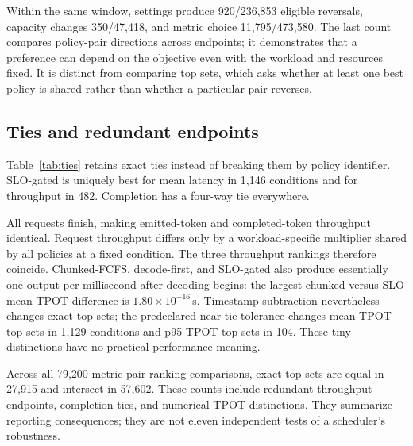 Within the same window, settings produce 920/236,853 eligible reversals,
capacity changes 350/47,418, and metric choice 11,795/473,580. The last count
compares policy-pair directions across endpoints; it demonstrates that a
preference can depend on the objective even with the workload and resources
fixed. It is distinct from comparing top sets, which asks whether at least
one best policy is shared rather than whether a particular pair reverses.

\subsection{Ties and redundant endpoints}
Table~\ref{tab:ties} retains exact ties instead of breaking them by policy
identifier. SLO-gated is uniquely best for mean latency in 1,146 conditions and for
throughput in 482. Completion has a four-way tie everywhere.

\begin{table}[t]
\centering\small
\caption{Ranking summaries, each out of 1,440 window/setting/capacity
conditions. ``Near-tie change'' counts conditions whose top set changes
under the predeclared $10^{-12}\max(1,|v_{\rm best}|)$ tolerance. No ranking
is missing. ``SLO unique top'' always uses exact equality.}
\label{tab:ties}
\end{table}

All requests finish, making emitted-token and completed-token throughput
identical. Request throughput differs only by a workload-specific multiplier
shared by all policies at a fixed condition. The three throughput rankings
therefore coincide. Chunked-FCFS, decode-first, and SLO-gated also produce
essentially one output per millisecond after decoding begins: the largest
chunked-versus-SLO mean-TPOT difference is $1.80\times10^{-16}$\,s.
Timestamp subtraction nevertheless changes exact top sets; the predeclared
near-tie tolerance changes mean-TPOT top sets in 1,129 conditions and p95-TPOT
top sets in 104. These tiny distinctions have no practical performance meaning.

Across all 79,200 metric-pair ranking comparisons, exact top sets are equal
in 27,915 and intersect in 57,602. These counts include redundant throughput
endpoints, completion ties, and numerical TPOT distinctions. They summarize
reporting consequences; they are not eleven independent tests of a
scheduler's robustness.

